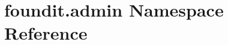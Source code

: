\hypertarget{namespacefoundit_1_1admin}{}\section{foundit.\+admin Namespace Reference}
\label{namespacefoundit_1_1admin}
